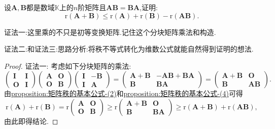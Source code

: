 \documentclass[../../main.tex]{subfiles}%
\begin{document}
\begin{proposition}\label{proposition:矩阵乘法可交换的秩不等式}
设\(\boldsymbol{A},\boldsymbol{B}\)都是数域\(\mathbb{K}\)上的\(n\)阶矩阵且\(\boldsymbol{A}\boldsymbol{B}=\boldsymbol{B}\boldsymbol{A}\),证明:
\[
\mathrm{r}(\boldsymbol{A}+\boldsymbol{B})\leqslant \mathrm{r}(\boldsymbol{A})+\mathrm{r}(\boldsymbol{B})-\mathrm{r}(\boldsymbol{A}\boldsymbol{B}).
\]
\end{proposition}
\begin{remark}
{\color{blue}证法一:}这里乘的不只是初等变换矩阵.记住这个分块矩阵乘法和构造.

{\color{blue}证法二:}和{\color{blue}证法三:}思路分析:将秩不等式转化为维数公式就能自然得到证明的想法.
\end{remark}
\begin{proof}

{\color{blue}证法一:}
考虑如下分块矩阵的乘法:
\[
\begin{pmatrix}
\boldsymbol{I}&\boldsymbol{I}\\
\boldsymbol{O}&\boldsymbol{I}
\end{pmatrix}
\begin{pmatrix}
\boldsymbol{A}&\boldsymbol{O}\\
\boldsymbol{O}&\boldsymbol{B}
\end{pmatrix}
\begin{pmatrix}
\boldsymbol{I}&-\boldsymbol{B}\\
\boldsymbol{I}&\boldsymbol{A}
\end{pmatrix}=
\begin{pmatrix}
\boldsymbol{A}+\boldsymbol{B}&-\boldsymbol{A}\boldsymbol{B}+\boldsymbol{B}\boldsymbol{A}\\
\boldsymbol{B}&\boldsymbol{B}\boldsymbol{A}
\end{pmatrix}=
\begin{pmatrix}
\boldsymbol{A}+\boldsymbol{B}&\boldsymbol{O}\\
\boldsymbol{B}&\boldsymbol{A}\boldsymbol{B}
\end{pmatrix}.
\]
由\hyperref[proposition:矩阵秩的基本公式-2]{proposition:矩阵秩的基本公式-(2)}和\hyperref[proposition:矩阵秩的基本公式-4]{proposition:矩阵秩的基本公式-(4)}可得
\[
\mathrm{r}(\boldsymbol{A})+\mathrm{r}(\boldsymbol{B})=\mathrm{r}\begin{pmatrix}
\boldsymbol{A}&\boldsymbol{O}\\
\boldsymbol{O}&\boldsymbol{B}
\end{pmatrix}\geqslant \mathrm{r}\begin{pmatrix}
\boldsymbol{A}+\boldsymbol{B}&\boldsymbol{O}\\
\boldsymbol{B}&\boldsymbol{B}\boldsymbol{A}
\end{pmatrix}\geqslant \mathrm{r}(\boldsymbol{A}+\boldsymbol{B})+\mathrm{r}(\boldsymbol{A}\boldsymbol{B}),
\]
由此即得结论.


\end{proof}
\end{document}
